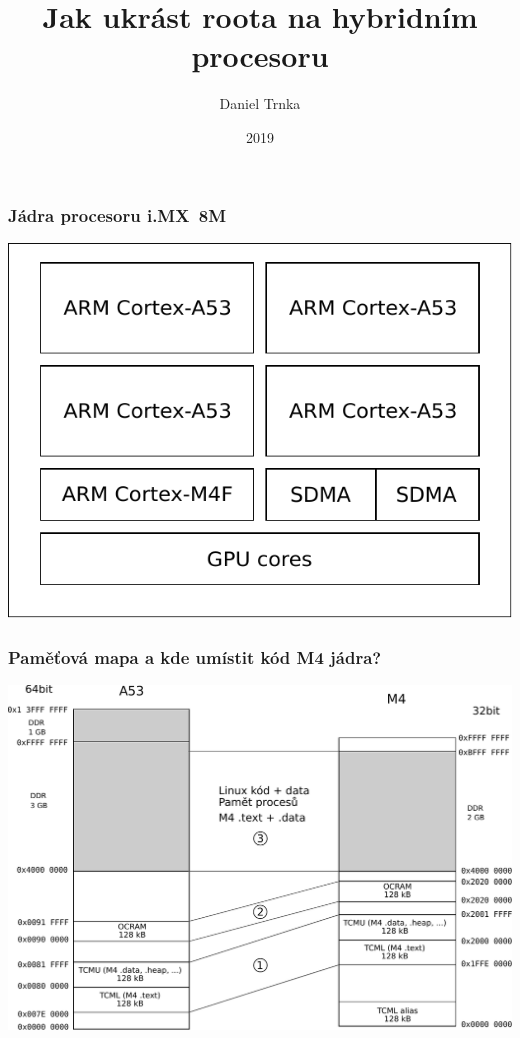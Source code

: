 \documentclass{beamer}
\title{Jak ukrást roota na hybridním procesoru}
\author{Daniel Trnka}
\institute{}
\date{2019}
\begin{document}
 
\frame{\titlepage}
 
\begin{frame}
\frametitle{Jádra procesoru i.MX~8M}
\centering
\includegraphics{figures/cores.pdf}

\end{frame}

\begin{frame}
\frametitle{Paměťová mapa a kde umístit kód M4 jádra?}
\centering
\includegraphics[width=\linewidth]{figures/memory.pdf}
\end{frame}
\end{document}
